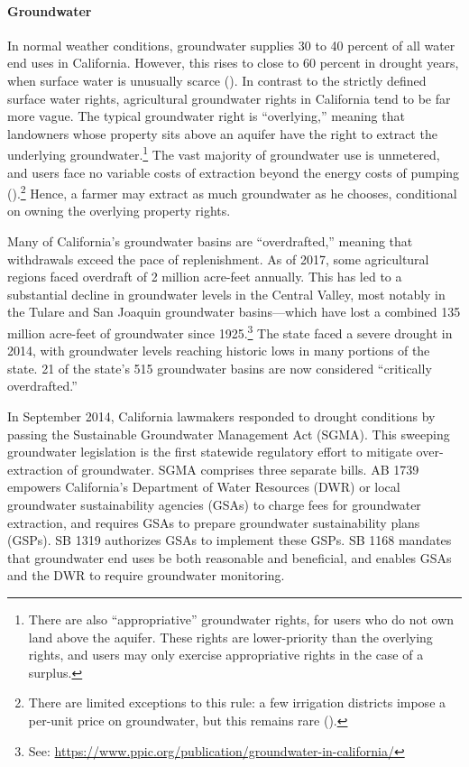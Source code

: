 \paragraph{Groundwater}
In normal weather conditions, groundwater supplies 30 to 40 percent of all water end uses in California. However, this rises to close to 60 percent in drought years, when surface water is unusually scarce (\textcite{cdwr2014}).
In contrast to the strictly defined surface water rights, agricultural groundwater rights in California tend to be far more vague. The typical groundwater right is ``overlying,'' meaning that landowners whose property sits above an aquifer have the right to extract the underlying groundwater.\footnote{
There are also ``appropriative'' groundwater rights, for users who do not own land above the aquifer. These rights are lower-priority than the overlying rights, and users may only exercise appropriative rights in the case of a surplus.}
The vast majority of groundwater use is unmetered, and users face no variable costs of extraction beyond the energy costs of pumping (\textcite{bruno2018}).\footnote{There are limited exceptions to this rule: a few irrigation districts impose a per-unit price on groundwater, but this remains rare (\textcite{bruno2018}).} Hence, a farmer may extract as much groundwater as he chooses, conditional on owning the overlying property rights. 

Many of California's groundwater basins are ``overdrafted,'' meaning that withdrawals exceed the pace of replenishment. As of 2017, some agricultural regions faced overdraft of 2 million acre-feet annually. This has led to a substantial decline in groundwater levels in the Central Valley, most notably in the Tulare and San Joaquin groundwater basins---which have lost a combined 135 million acre-feet of groundwater since 1925.\footnote{See: \url{https://www.ppic.org/publication/groundwater-in-california/}} The state faced a severe drought in 2014, with groundwater levels reaching historic lows in many portions of the state. 21 of the state's 515 groundwater basins are now considered ``critically overdrafted.''

In September 2014, California lawmakers responded to drought conditions by passing the Sustainable Groundwater Management Act (SGMA). This sweeping groundwater legislation is the first statewide regulatory effort to mitigate over-extraction of groundwater. SGMA comprises three separate bills. AB 1739 empowers California's Department of Water Resources (DWR) or local groundwater sustainability agencies (GSAs) to charge fees for groundwater extraction, and requires GSAs to prepare groundwater sustainability plans (GSPs). SB 1319 authorizes GSAs to implement these GSPs. SB 1168 mandates that groundwater end uses be both reasonable and beneficial, and enables GSAs and the DWR to require groundwater monitoring. 

